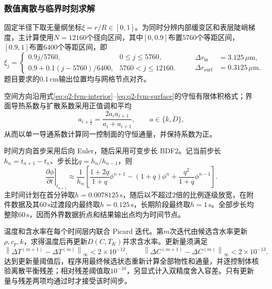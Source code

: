 \documentclass[withoutpreface,bwprint]{cumcmthesis}
\begin{document}
\subsubsection{数值离散与临界时刻求解}

固定半径下取无量纲坐标$\xi=r/R\in[0,1]$。为同时分辨内部缓变区和表层陡峭梯度，主计算使用$N=12160$个径向区间，其中$[0,0.9]$布置$5760$个等距区间，$[0.9,1]$布置$6400$个等距区间，即
\begin{equation}
\xi_j=
\begin{cases}
0.9j/5760, & 0\le j\le5760,\\
0.9+0.1(j-5760)/6400, & 5760<j\le12160.
\end{cases}
\qquad
\begin{aligned}
\Delta r_{\mathrm{in}}&=3.125\,\mu\mathrm m,\\
\Delta r_{\mathrm{surf}}&=0.3125\,\mu\mathrm m.
\end{aligned}
\label{eq:q3-space-grid}
\end{equation}
题目要求的$0.1\,\mathrm{cm}$输出位置均与网格节点对齐。

空间方向沿用式\eqref{eq:q2-fvm-interior}--\eqref{eq:q2-fvm-surface}的守恒有限体积格式；界面导热系数与扩散系数采用正值调和平均
\begin{equation}
a_{i+\frac12}
=\frac{2a_i a_{i+1}}{a_i+a_{i+1}},
\qquad a\in\{k,D\},
\label{eq:q3-face-harmonic}
\end{equation}
从而以单一导通系数计算同一控制面的守恒通量，并保持系数为正。

时间方向首步采用后向 Euler，随后采用可变步长 BDF2\cite{hairer1996}。记当前步长$h_n=t_{n+1}-t_n$、步长比$q=h_n/h_{n-1}$，则
\begin{equation}
\left.\frac{\partial\phi}{\partial t}\right|_{t_{n+1}}
\approx\frac{1}{h_n}
\left[
\frac{1+2q}{1+q}\phi^{n+1}
-(1+q)\phi^n
+\frac{q^2}{1+q}\phi^{n-1}
\right].
\label{eq:q3-bdf2}
\end{equation}
主时间计划在首分钟取$h=0.0078125\,\mathrm s$，随后以不超过$2$倍的比例逐级放宽，在附件数据及其$60\,\mathrm s$过渡段内最终取$h=0.125\,\mathrm s$，长期阶段最终取$h=1\,\mathrm s$。全部步长均整除$60\,\mathrm s$，因而外界数据折点和结果输出点均为时间节点。

温度和含水率在每个时间层内联合 Picard 迭代。第$m$次迭代由候选含水率更新$\rho,c_p,k$，求得温度后再更新$D(C,T_K)$并求含水率。更新量须满足
\begin{equation}
\left\|\Delta T^{(m+1)}-\Delta T^{(m)}\right\|_\infty
<2\times10^{-12},
\qquad
\left\|\Delta C^{(m+1)}-\Delta C^{(m)}\right\|_\infty
<2\times10^{-13}.
\label{eq:q3-picard-criterion}
\end{equation}
达到更新量阈值后，程序用最终候选状态重新计算全部物性和通量，并逐控制体核验离散平衡残差；相对残差阈值取$10^{-10}$，另显式计入双精度舍入容差。只有更新量与残差两项均通过时才接受该时间步。
\end{document}
